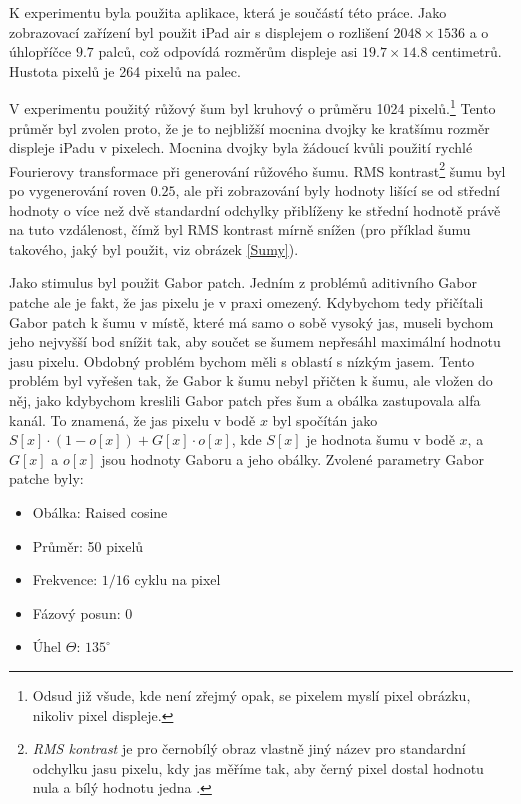 K experimentu byla použita aplikace, která je součástí této práce. 
Jako zobrazovací zařízení byl použit iPad air s displejem o rozlišení
$2048\times1536$ a o úhlopříčce $9.7$ palců, což odpovídá rozměrům displeje asi
$19.7 \times 14.8$ centimetrů. Hustota pixelů je 264 pixelů na palec. 

V experimentu použitý růžový šum byl kruhový o průměru 1024 pixelů.\footnote{Odsud již všude, kde není zřejmý opak, se pixelem myslí
pixel obrázku, nikoliv pixel displeje.} Tento průměr byl zvolen proto, že je
to nejbližší mocnina dvojky ke kratšímu rozměr displeje iPadu v pixelech.
Mocnina dvojky byla žádoucí kvůli použití rychlé Fourierovy transformace při
generování růžového šumu. RMS kontrast\footnote{{\it RMS kontrast} je pro
černobílý obraz vlastně jiný název pro standardní odchylku jasu pixelu, kdy jas
měříme tak, aby černý pixel dostal hodnotu nula a bílý hodnotu jedna
\citep{RMS}.} šumu byl po vygenerování roven $0.25$, ale při zobrazování byly
hodnoty lišící se od střední hodnoty o více než dvě standardní odchylky
přiblíženy ke střední hodnotě právě na tuto vzdálenost, čímž byl RMS kontrast
mírně snížen (pro příklad šumu takového, jaký byl použit, viz obrázek \ref{Sumy}). 

Jako stimulus byl použit Gabor patch. Jedním z problémů aditivního Gabor patche
ale je fakt, že jas pixelu je v praxi omezený. Kdybychom tedy přičítali Gabor
patch k šumu v místě, které má samo o sobě vysoký jas, museli bychom jeho nejvyšší
bod snížit tak, aby součet se šumem nepřesáhl maximální hodnotu jasu pixelu.
Obdobný problém bychom měli s oblastí s nízkým jasem. Tento problém byl vyřešen
tak, že Gabor k šumu nebyl přičten k šumu, ale vložen do něj, jako
kdybychom kreslili Gabor patch přes šum a obálka zastupovala alfa kanál. To
znamená, že jas pixelu v bodě $x$ byl spočítán jako $S[x] \cdot (1-o[x]) +
G[x]\cdot o[x]$, kde $S[x]$ je hodnota šumu v bodě $x$, a $G[x]$ a $o[x]$ jsou
hodnoty Gaboru a jeho obálky.  Zvolené parametry Gabor patche byly:

\begin{itemize}
\item Obálka: Raised cosine
\item Průměr: 50 pixelů
\item Frekvence: $1/16$ cyklu na pixel
\item Fázový posun: 0
\item Úhel $\Theta$: $135^\circ$ 
\end{itemize}

